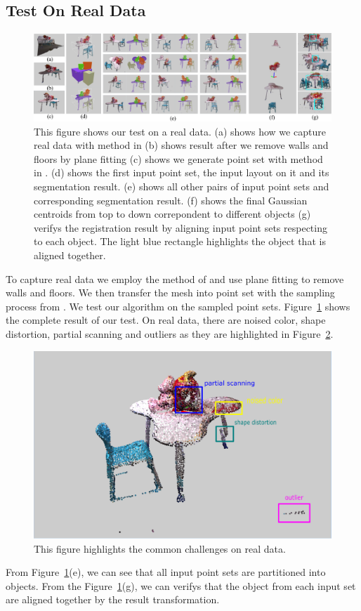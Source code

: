 \subsection{Test On Real Data}
\begin{figure}[htb]
	\centering
	\includegraphics[width=\linewidth]{images/realdata/realdata}
	\caption{\label{fig:realdata}This figure shows our test on a real data. (a) shows how we capture real data with method in \cite{VXH} (b) shows result after we remove walls and floors by plane fitting (c) shows we generate point set with method in \cite{PossionSampling}. (d) shows the first input point set, the input layout on it and its segmentation result. (e) shows all other pairs of input point sets and corresponding segmentation result. (f) shows the final Gaussian centroids from top to down correpondent to different objects (g) verifys the registration result by aligning input point sets respecting to each object. The light blue rectangle highlights the object that is aligned together. }
\end{figure}
To capture real data we employ the method of \cite{VXH} and use plane fitting to remove walls and floors. We then transfer the mesh into point set with the sampling process from \cite{PossionSampling}.
We test our algorithm on the sampled point sets. Figure~{\ref{fig:realdata}} shows the complete result of our test. On real data, there are noised color, shape distortion, partial scanning and outliers as they are highlighted in Figure~\ref{fig:challenge}. 
\begin{figure}
	\centering
	\includegraphics[width=\linewidth]{images/challenge/challenge}
	\caption{\label{fig:challenge}This figure highlights the common challenges on real data.}
\end{figure}
From Figure~\ref{fig:realdata}(e), we can see that all input point sets are partitioned into objects. From the Figure~\ref{fig:realdata}(g), we can verifys that the object from each input set are aligned together by the result transformation.  
